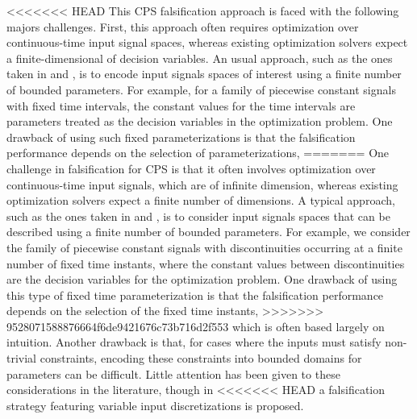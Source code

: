 <<<<<<< HEAD
This CPS falsification approach is faced with the following majors challenges.
First, this approach often
requires optimization over continuous-time input signal spaces, whereas
existing optimization solvers expect a finite-dimensional of decision variables. 
An usual approach, such as the ones taken in \cite{BreachCAV10} and 
\cite{Nghiem10}, is to encode input signals spaces of interest using a
finite number of bounded parameters. For example, for a family of
piecewise constant signals with fixed time intervals, the
constant values for the time intervals are parameters treated as the decision variables in the optimization
problem. One drawback of using such fixed parameterizations 
is that the falsification performance depends on the selection of parameterizations, 
=======
One challenge in falsification for CPS is that it often
involves optimization over continuous-time input signals, which are of infinite 
dimension, whereas existing optimization solvers expect a finite number of 
dimensions. 
A typical approach, such as the ones taken in \cite{BreachCAV10} and 
\cite{Nghiem10}, is to consider input signals spaces that can be described using a
finite number of bounded parameters. For example, we consider the family of
piecewise constant signals with discontinuities occurring at a finite number of fixed time instants, where the
constant values between discontinuities are the decision variables for the optimization
problem. One drawback of using this type of fixed time parameterization 
is that the falsification performance depends on the selection of the fixed time instants, 
>>>>>>> 9528071588876664f6de9421676c73b716d2f553
which is often based largely on intuition. Another drawback is that, for cases where the
inputs must satisfy non-trivial constraints, encoding these constraints 
into bounded domains for parameters can be difficult. Little attention has
been given to these considerations in the literature, though in 
<<<<<<< HEAD
\cite{DBLP:conf/atva/DeshmukhJKM15} a
falsification strategy featuring variable input discretizations is proposed.

